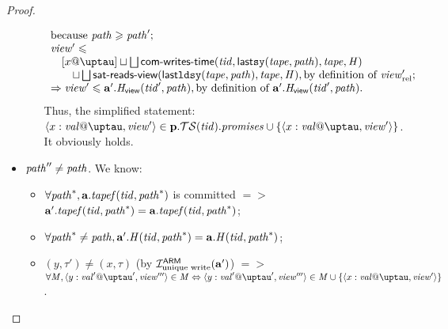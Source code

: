 \begin{proof}
\begin{itemize}
\begin{itemize}
\[\begin{array}{l}
\text{because } \cpath \ge \cpath';\\
\R' \le \\
\quad [x @ \tau] \sqcup \bigsqcup \opstau(\tId, \lastSY(\tape, \cpath), \tape, \hmap) \\
\quad \quad      \sqcup \bigsqcup \readsSatisfiedR(\lastLDSY(\tape, \cpath), \tape, \hmap),
\text{by definition of } \Rrel';\\
=> \R' \le \aT'.\rmap(\tId', \cpath),
\text{by definition of } \aT'.\rmap(\tId', \cpath).\\
\end{array}
\]
      Thus, the simplified statement:
      $\writeEvt{x}{\stval}{\tau}{\R'} \in \p.\TSfprom(\tId).\PromSet \cup \{\writeEvt{x}{\stval}{\tau}{\R'}\}$. It obviously holds.
    \end{itemize}

      \item $\mathit{path}'' \not = \mathit{path}$.
        We know:
        \begin{itemize}
          \item $\forall \mathit{path}^{*}, \mathbf{a}.\mathit{tapef}(\mathit{tid}, \mathit{path}^{*})$ is committed $=>$ 
                $\mathbf{a}'.\mathit{tapef}(\mathit{tid}, \mathit{path}^{*}) = \mathbf{a}.\mathit{tapef}(\mathit{tid}, \mathit{path}^{*})$;
          \item $\forall \mathit{path}^{*} \not = \mathit{path}, \mathbf{a}'.\mathit{H}(\mathit{tid}, \mathit{path}^{*}) = \mathbf{a}.\mathit{H}(\mathit{tid}, \mathit{path}^{*})$;
          \item $(y, \tau') \not = (x, \tau)$ (by $\mathcal{I}^\mathsf{ARM}_{\textup{\rm unique write}}(\mathbf{a}')$) $=>$ \\
                $\forall \Mprom, \writeEvt{y}{\stval'}{\tau'}{\R'''} \in \Mprom \Leftrightarrow \writeEvt{y}{\stval'}{\tau'}{\R'''} \in \Mprom \cup \{\writeEvt{x}{\stval}{\tau}{\R'}\}$.
        \end{itemize}


\end{itemize}
\end{proof}
